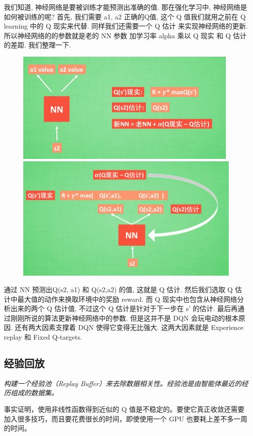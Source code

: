 \documentclass[UTF8,a4paper,12pt]{ctexbook}
\begin{document}
			我们知道, 神经网络是要被训练才能预测出准确的值. 那在强化学习中, 神经网络是如何被训练的呢? 首先, 我们需要 a1, a2 正确的Q值, 这个 Q 值我们就用之前在 Q learning 中的 Q 现实来代替. 同样我们还需要一个 Q 估计 来实现神经网络的更新. 所以神经网络的的参数就是老的 NN 参数 加学习率 alpha 乘以 Q 现实 和 Q 估计 的差距. 我们整理一下.
			\begin{figure}[H]
				\centering
				\includegraphics[width=.9\linewidth]{DQN3}
				\includegraphics[width=.9\linewidth]{DQN4}
			\end{figure}			
			通过 NN 预测出Q(s2, a1) 和 Q(s2,a2) 的值, 这就是 Q 估计. 然后我们选取 Q 估计中最大值的动作来换取环境中的奖励 reward. 而 Q 现实中也包含从神经网络分析出来的两个 Q 估计值, 不过这个 Q 估计是针对于下一步在 s’ 的估计. 最后再通过刚刚所说的算法更新神经网络中的参数. 但是这并不是 DQN 会玩电动的根本原因. 还有两大因素支撑着 DQN 使得它变得无比强大. 这两大因素就是 Experience replay 和 Fixed Q-targets.
		
		\subsection{经验回放}
			\textit{构建一个经验池（Replay Buffer）来去除数据相关性。经验池是由智能体最近的经历组成的数据集。}
		
			事实证明，使用非线性函数得到近似的 Q 值是不稳定的。要使它真正收敛还需要加入很多技巧，而且要花费很长的时间，即使使用一个 GPU 也要耗上差不多一周的时间。
			
\end{document}
